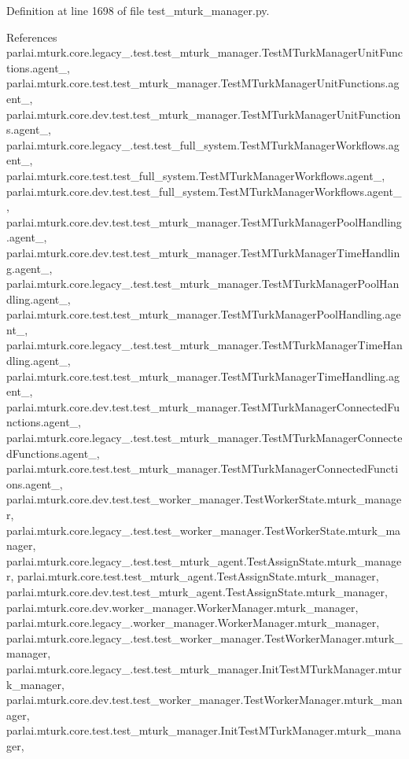 Definition at line 1698 of file test\+\_\+mturk\+\_\+manager.\+py.



References parlai.\+mturk.\+core.\+legacy\+\_.\+test.\+test\+\_\+mturk\+\_\+manager.\+Test\+M\+Turk\+Manager\+Unit\+Functions.\+agent\+\_, parlai.\+mturk.\+core.\+test.\+test\+\_\+mturk\+\_\+manager.\+Test\+M\+Turk\+Manager\+Unit\+Functions.\+agent\+\_, parlai.\+mturk.\+core.\+dev.\+test.\+test\+\_\+mturk\+\_\+manager.\+Test\+M\+Turk\+Manager\+Unit\+Functions.\+agent\+\_, parlai.\+mturk.\+core.\+legacy\+\_.\+test.\+test\+\_\+full\+\_\+system.\+Test\+M\+Turk\+Manager\+Workflows.\+agent\+\_, parlai.\+mturk.\+core.\+test.\+test\+\_\+full\+\_\+system.\+Test\+M\+Turk\+Manager\+Workflows.\+agent\+\_, parlai.\+mturk.\+core.\+dev.\+test.\+test\+\_\+full\+\_\+system.\+Test\+M\+Turk\+Manager\+Workflows.\+agent\+\_, parlai.\+mturk.\+core.\+dev.\+test.\+test\+\_\+mturk\+\_\+manager.\+Test\+M\+Turk\+Manager\+Pool\+Handling.\+agent\+\_, parlai.\+mturk.\+core.\+dev.\+test.\+test\+\_\+mturk\+\_\+manager.\+Test\+M\+Turk\+Manager\+Time\+Handling.\+agent\+\_, parlai.\+mturk.\+core.\+legacy\+\_.\+test.\+test\+\_\+mturk\+\_\+manager.\+Test\+M\+Turk\+Manager\+Pool\+Handling.\+agent\+\_, parlai.\+mturk.\+core.\+test.\+test\+\_\+mturk\+\_\+manager.\+Test\+M\+Turk\+Manager\+Pool\+Handling.\+agent\+\_, parlai.\+mturk.\+core.\+legacy\+\_.\+test.\+test\+\_\+mturk\+\_\+manager.\+Test\+M\+Turk\+Manager\+Time\+Handling.\+agent\+\_, parlai.\+mturk.\+core.\+test.\+test\+\_\+mturk\+\_\+manager.\+Test\+M\+Turk\+Manager\+Time\+Handling.\+agent\+\_, parlai.\+mturk.\+core.\+dev.\+test.\+test\+\_\+mturk\+\_\+manager.\+Test\+M\+Turk\+Manager\+Connected\+Functions.\+agent\+\_, parlai.\+mturk.\+core.\+legacy\+\_.\+test.\+test\+\_\+mturk\+\_\+manager.\+Test\+M\+Turk\+Manager\+Connected\+Functions.\+agent\+\_, parlai.\+mturk.\+core.\+test.\+test\+\_\+mturk\+\_\+manager.\+Test\+M\+Turk\+Manager\+Connected\+Functions.\+agent\+\_, parlai.\+mturk.\+core.\+dev.\+test.\+test\+\_\+worker\+\_\+manager.\+Test\+Worker\+State.\+mturk\+\_\+manager, parlai.\+mturk.\+core.\+legacy\+\_.\+test.\+test\+\_\+worker\+\_\+manager.\+Test\+Worker\+State.\+mturk\+\_\+manager, parlai.\+mturk.\+core.\+legacy\+\_.\+test.\+test\+\_\+mturk\+\_\+agent.\+Test\+Assign\+State.\+mturk\+\_\+manager, parlai.\+mturk.\+core.\+test.\+test\+\_\+mturk\+\_\+agent.\+Test\+Assign\+State.\+mturk\+\_\+manager, parlai.\+mturk.\+core.\+dev.\+test.\+test\+\_\+mturk\+\_\+agent.\+Test\+Assign\+State.\+mturk\+\_\+manager, parlai.\+mturk.\+core.\+dev.\+worker\+\_\+manager.\+Worker\+Manager.\+mturk\+\_\+manager, parlai.\+mturk.\+core.\+legacy\+\_.\+worker\+\_\+manager.\+Worker\+Manager.\+mturk\+\_\+manager, parlai.\+mturk.\+core.\+legacy\+\_.\+test.\+test\+\_\+worker\+\_\+manager.\+Test\+Worker\+Manager.\+mturk\+\_\+manager, parlai.\+mturk.\+core.\+legacy\+\_.\+test.\+test\+\_\+mturk\+\_\+manager.\+Init\+Test\+M\+Turk\+Manager.\+mturk\+\_\+manager, parlai.\+mturk.\+core.\+dev.\+test.\+test\+\_\+worker\+\_\+manager.\+Test\+Worker\+Manager.\+mturk\+\_\+manager, parlai.\+mturk.\+core.\+test.\+test\+\_\+mturk\+\_\+manager.\+Init\+Test\+M\+Turk\+Manager.\+mturk\+\_\+manager, 